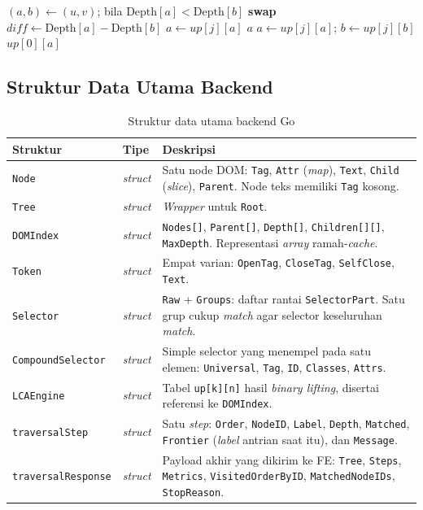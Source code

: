 \begin{algorithm}[H]
\caption{Query(u, v)}
\begin{algorithmic}[1]
\State $(a, b) \gets (u, v)$; bila $\text{Depth}[a] < \text{Depth}[b]$ \textbf{swap}
\State $diff \gets \text{Depth}[a] - \text{Depth}[b]$
     $a \gets up[j][a]$ \EndIf
\EndFor
{} \Return $a$ \EndIf
{}
     $a \gets up[j][a]$; $b \gets up[j][b]$ \EndIf
\EndFor
\State \Return $up[0][a]$
\end{algorithmic}
\end{algorithm}

\subsection{Struktur Data Utama Backend}

\begin{table}[H]
\centering
\caption{Struktur data utama backend Go}
\begin{tabularx}{\textwidth}{|l|l|X|}
\hline
\textbf{Struktur} & \textbf{Tipe} & \textbf{Deskripsi} \\
\hline
\texttt{Node} & \textit{struct} & Satu node DOM: \texttt{Tag}, \texttt{Attr} (\textit{map}), \texttt{Text}, \texttt{Child} (\textit{slice}), \texttt{Parent}. Node teks memiliki \texttt{Tag} kosong. \\
\hline
\texttt{Tree} & \textit{struct} & \textit{Wrapper} untuk \texttt{Root}. \\
\hline
\texttt{DOMIndex} & \textit{struct} & \texttt{Nodes[]}, \texttt{Parent[]}, \texttt{Depth[]}, \texttt{Children[][]}, \texttt{MaxDepth}. Representasi \textit{array} ramah-\textit{cache}. \\
\hline
\texttt{Token} & \textit{struct} & Empat varian: \texttt{OpenTag}, \texttt{CloseTag}, \texttt{SelfClose}, \texttt{Text}. \\
\hline
\texttt{Selector} & \textit{struct} & \texttt{Raw} + \texttt{Groups}: daftar rantai \texttt{SelectorPart}. Satu grup cukup \textit{match} agar selector keseluruhan \textit{match}. \\
\hline
\texttt{CompoundSelector} & \textit{struct} & Simple selector yang menempel pada satu elemen: \texttt{Universal}, \texttt{Tag}, \texttt{ID}, \texttt{Classes}, \texttt{Attrs}. \\
\hline
\texttt{LCAEngine} & \textit{struct} & Tabel \texttt{up[k][n]} hasil \textit{binary lifting}, disertai referensi ke \texttt{DOMIndex}. \\
\hline
\texttt{traversalStep} & \textit{struct} & Satu \textit{step}: \texttt{Order}, \texttt{NodeID}, \texttt{Label}, \texttt{Depth}, \texttt{Matched}, \texttt{Frontier} (\textit{label} antrian saat itu), dan \texttt{Message}. \\
\hline
\texttt{traversalResponse} & \textit{struct} & Payload akhir yang dikirim ke FE: \texttt{Tree}, \texttt{Steps}, \texttt{Metrics}, \texttt{VisitedOrderByID}, \texttt{MatchedNodeIDs}, \texttt{StopReason}. \\
\hline
\end{tabularx}
\end{table}

